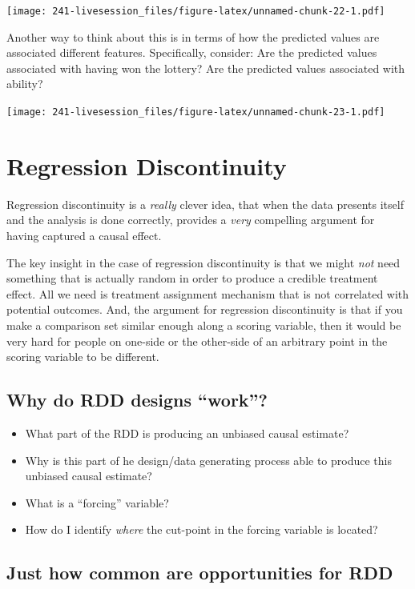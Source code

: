 \documentclass[
]{book}
\begin{document}
\texttt{[image: 241-livesession\_files/figure-latex/unnamed-chunk-22-1.pdf]}

Another way to think about this is in terms of how the predicted values
are associated different features. Specifically, consider: Are the
predicted values associated with having won the lottery? Are the
predicted values associated with ability?

\texttt{[image: 241-livesession\_files/figure-latex/unnamed-chunk-23-1.pdf]}

\hypertarget{regression-discontinuity}{%
\section{Regression Discontinuity}\label{regression-discontinuity}}

Regression discontinuity is a \emph{really} clever idea, that when the
data presents itself and the analysis is done correctly, provides a
\emph{very} compelling argument for having captured a causal effect.

The key insight in the case of regression discontinuity is that we might
\emph{not} need something that is actually random in order to produce a
credible treatment effect. All we need is treatment assignment mechanism
that is not correlated with potential outcomes. And, the argument for
regression discontinuity is that if you make a comparison set similar
enough along a scoring variable, then it would be very hard for people
on one-side or the other-side of an arbitrary point in the scoring
variable to be different.

\hypertarget{why-do-rdd-designs-work}{%
\subsection{Why do RDD designs
``work''?}\label{why-do-rdd-designs-work}}

\begin{itemize}
\item
  What part of the RDD is producing an unbiased causal estimate?
\item
  Why is this part of he design/data generating process able to produce
  this unbiased causal estimate?
\item
  What is a ``forcing'' variable?
\item
  How do I identify \emph{where} the cut-point in the forcing variable
  is located?
\end{itemize}

\hypertarget{just-how-common-are-opportunities-for-rdd}{%
\subsection{Just how common are opportunities for
RDD}\label{just-how-common-are-opportunities-for-rdd}}
\end{document}
